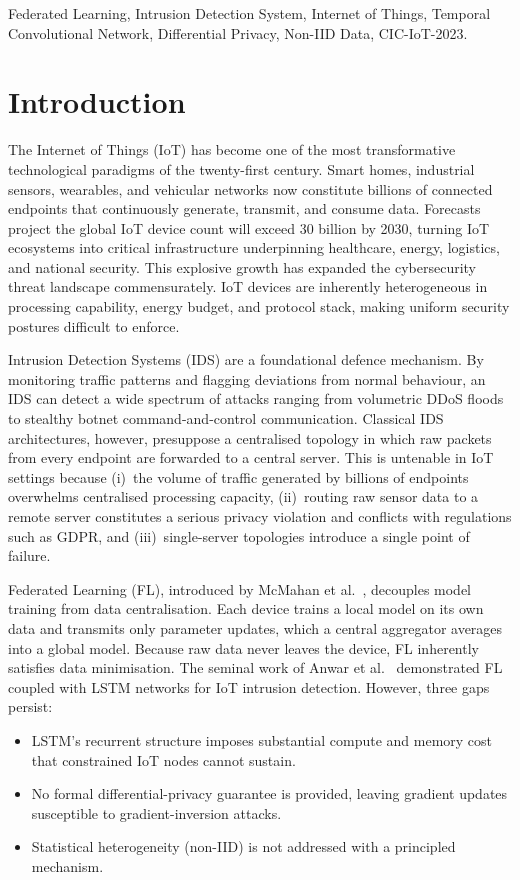 \documentclass[conference]{IEEEtran}
\begin{document}
\begin{IEEEkeywords}
Federated Learning, Intrusion Detection System, Internet of Things,
Temporal Convolutional Network, Differential Privacy, Non-IID Data,
CIC-IoT-2023.
\end{IEEEkeywords}

\section{Introduction}\label{sec:intro}
The Internet of Things (IoT) has become one of the most transformative
technological paradigms of the twenty-first century. Smart homes,
industrial sensors, wearables, and vehicular networks now constitute
billions of connected endpoints that continuously generate, transmit,
and consume data. Forecasts project the global IoT device count will
exceed 30 billion by 2030, turning IoT ecosystems into critical
infrastructure underpinning healthcare, energy, logistics, and national
security. This explosive growth has expanded the cybersecurity threat
landscape commensurately. IoT devices are inherently heterogeneous in
processing capability, energy budget, and protocol stack, making
uniform security postures difficult to enforce.

Intrusion Detection Systems (IDS) are a foundational defence
mechanism. By monitoring traffic patterns and flagging deviations from
normal behaviour, an IDS can detect a wide spectrum of attacks ranging
from volumetric DDoS floods to stealthy botnet command-and-control
communication. Classical IDS architectures, however, presuppose a
centralised topology in which raw packets from every endpoint are
forwarded to a central server. This is untenable in IoT settings
because (i)~the volume of traffic generated by billions of endpoints
overwhelms centralised processing capacity, (ii)~routing raw sensor
data to a remote server constitutes a serious privacy violation and
conflicts with regulations such as GDPR, and (iii)~single-server
topologies introduce a single point of failure.

Federated Learning (FL), introduced by McMahan et al.~\cite{mcmahan2017},
decouples model training from data centralisation. Each device trains
a local model on its own data and transmits only parameter updates,
which a central aggregator averages into a global model. Because raw
data never leaves the device, FL inherently satisfies data
minimisation. The seminal work of Anwar et al.~\cite{anwar2025}
demonstrated FL coupled with LSTM networks for IoT intrusion
detection. However, three gaps persist:
\begin{itemize}
\item LSTM's recurrent structure imposes substantial compute and
      memory cost that constrained IoT nodes cannot sustain.
\item No formal differential-privacy guarantee is provided, leaving
      gradient updates susceptible to gradient-inversion attacks.
\item Statistical heterogeneity (non-IID) is not addressed
      with a principled mechanism.
\end{itemize}
\end{document}
